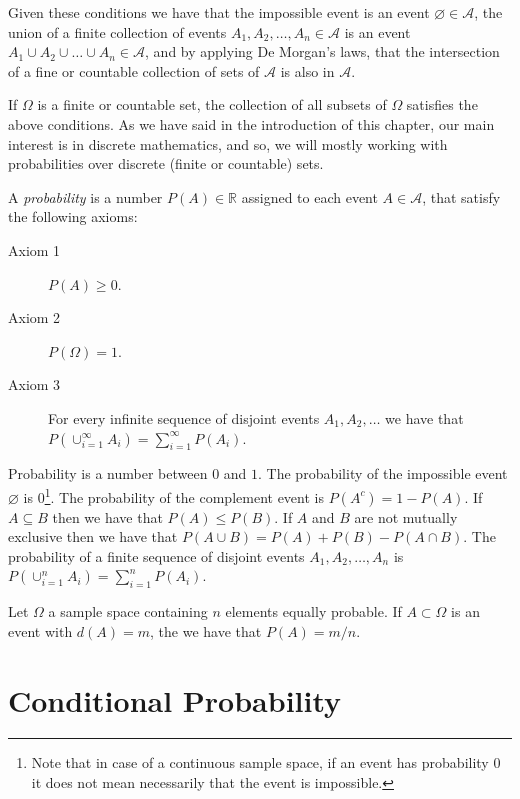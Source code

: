 Given these conditions we have that the impossible event is an event $\varnothing \in \mathcal{A}$, the union of a finite collection of events $A_1, A_2, \ldots, A_n \in \mathcal{A}$ is an event $A_1 \cup A_2 \cup \ldots \cup A_n \in \mathcal{A}$, and by applying De Morgan's laws, that the intersection of a fine or countable collection of sets of $\mathcal{A}$ is also in $\mathcal{A}$.

If $\Omega$ is a finite or countable set, the collection of all subsets of $\Omega$ satisfies the above conditions. As we have said in the introduction of this chapter, our main interest is in discrete mathematics, and so, we will mostly working with probabilities over discrete (finite or countable) sets.

A \emph{probability} is a number $P(A) \in \mathbb{R}$ assigned to each event $A \in \mathcal{A}$, that satisfy the following axioms:

\medskip

\begin{description}
\item [Axiom 1] $P(A) \geq 0$.
\item [Axiom 2] $P(\Omega) = 1$.
\item [Axiom 3] For every infinite sequence of disjoint events $A_1, A_2, \ldots$ we have that $P(\cup_{i=1}^\infty A_i) = \sum_{i=1}^\infty P(A_i)$.
\end{description}

\medskip

Probability is a number between $0$ and $1$. The probability of the impossible event $\varnothing$ is $0$\footnote{Note that in case of a continuous sample space, if an event has probability $0$ it does not mean necessarily that the event is impossible.}. The probability of the complement event is $P(A^c) = 1 - P(A)$. If $A \subseteq B$ then we have that $P(A) \leq P(B)$. If $A$ and $B$ are not mutually exclusive then we have that $P(A \cup B) = P(A) + P(B) - P(A \cap B)$. The probability of a finite sequence of disjoint events $A_1, A_2, \ldots, A_n$ is $P(\cup_{i=1}^n A_i) = \sum_{i=1}^n P(A_i)$.

\begin{example}
Let $\Omega$ a sample space containing $n$ elements equally probable. If $A \subset \Omega$ is an event with $d(A) = m$, the we have that $P(A) = m/n$.
\end{example}


%
%

\section{Conditional Probability}
\label{sec:probability_conditional}


